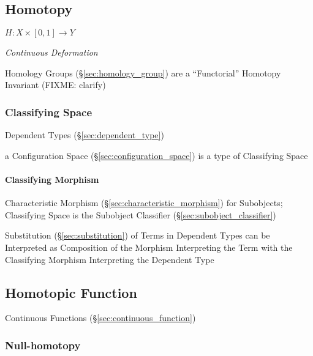 \subsection{Homotopy}\label{sec:homotopy}

$H : X \times [0,1] \rightarrow Y$

\emph{Continuous Deformation}

Homology Groups (\S\ref{sec:homology_group}) are a ``Functorial'' Homotopy
Invariant (FIXME: clarify)



\subsubsection{Classifying Space}\label{sec:classifying_space}

Dependent Types (\S\ref{sec:dependent_type})

a Configuration Space (\S\ref{sec:configuration_space}) is a type of
Classifying Space



\paragraph{Classifying Morphism}\label{sec:classifying_morphism}\hfill

Characteristic Morphism (\S\ref{sec:characteristic_morphism}) for
Subobjects; Classifying Space is the Subobject Classifier
(\S\ref{sec:subobject_classifier})

Substitution (\S\ref{sec:substitution}) of Terms in Dependent Types
can be Interpreted as Composition of the Morphism Interpreting the
Term with the Classifying Morphism Interpreting the Dependent Type



\subsection{Homotopic Function}\label{sec:homotopic_function}

Continuous Functions (\S\ref{sec:continuous_function})



\subsubsection{Null-homotopy}\label{sec:null_homotopy}

